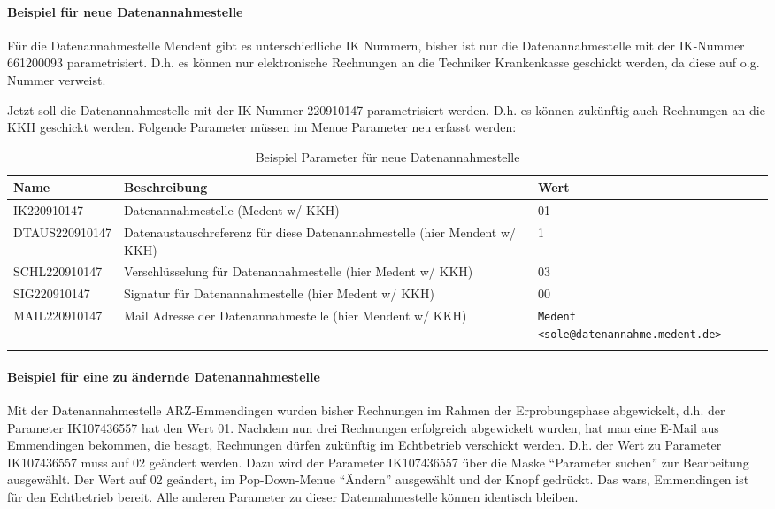 \paragraph{Beispiel für neue Datenannahmestelle}
Für die Datenannahmestelle Mendent gibt es unterschiedliche IK Nummern,
bisher ist nur die Datenannahmestelle mit der IK-Nummer 661200093
parametrisiert. D.h. es können nur elektronische Rechnungen an die
Techniker Krankenkasse geschickt werden, da diese auf o.g. Nummer
verweist.

Jetzt soll die Datenannahmestelle mit der IK Nummer 220910147
parametrisiert werden. D.h. es können zukünftig auch Rechnungen an
die KKH geschickt werden. Folgende Parameter müssen im Menue
Parameter neu erfasst werden:
\begin{table}[H]
\begin{tabular}{|p{3cm}|p{5cm}|p{5cm}|}
\firsthline
\textbf{Name}&\textbf{Beschreibung}&\textbf{Wert}
\tabularnewline\hline
IK220910147&
Datenannahmestelle (Medent w/ KKH)&
01
\tabularnewline\hline
DTAUS220910147&
Datenaustauschreferenz für diese Datenannahmestelle (hier Mendent w/ KKH)&
1
\tabularnewline\hline
SCHL220910147&
Verschlüsselung für Datenannahmestelle (hier Medent w/ KKH)&
03
\tabularnewline\hline
SIG220910147&
Signatur für Datenannahmestelle (hier Medent w/ KKH)&
00
\tabularnewline\hline
MAIL220910147&
Mail Adresse der Datenannahmestelle (hier Mendent w/ KKH)&
\nolinkurl{Medent <sole@datenannahme.medent.de>}
\tabularnewline\hline
\lasthline
\end{tabular}
\caption{Beispiel Parameter für neue Datenannahmestelle\label{beispiel_parm}}
\end{table}



\paragraph{Beispiel für eine zu ändernde Datenannahmestelle}
Mit der Datenannahmestelle ARZ-Emmendingen wurden bisher Rechnungen
im Rahmen der Erprobungsphase abgewickelt, d.h. der Parameter
IK107436557 hat den Wert 01. Nachdem nun drei Rechnungen erfolgreich
abgewickelt wurden, hat man eine E-Mail aus Emmendingen bekommen, die besagt,
Rechnungen dürfen zukünftig im Echtbetrieb verschickt werden.
D.h. der Wert zu Parameter IK107436557 muss auf 02  geändert werden.
Dazu wird der Parameter IK107436557 über die Maske ``Parameter suchen'' zur
Bearbeitung ausgewählt. Der Wert auf 02 geändert, im Pop-Down-Menue
``Ändern'' ausgewählt und der Knopf  gedrückt. Das
wars, Emmendingen ist für den Echtbetrieb bereit. Alle anderen Parameter
zu dieser Datennahmestelle können identisch bleiben.

